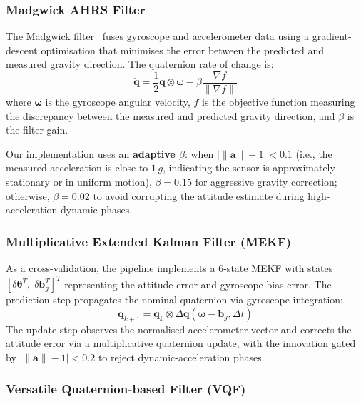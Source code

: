\subsubsection{Madgwick AHRS Filter}

The Madgwick filter~\cite{madgwick2011} fuses gyroscope and accelerometer data using a gradient-descent optimisation that minimises the error between the predicted and measured gravity direction.
The quaternion rate of change is:
\begin{equation}\label{eq:madgwick}
  \dot{\mathbf{q}} = \frac{1}{2}\mathbf{q} \otimes \boldsymbol{\omega} - \beta \frac{\nabla f}{\|\nabla f\|}
\end{equation}
where $\boldsymbol{\omega}$ is the gyroscope angular velocity, $f$ is the objective function measuring the discrepancy between the measured and predicted gravity direction, and $\beta$ is the filter gain.

Our implementation uses an \textbf{adaptive $\beta$}: when $\left|\|\mathbf{a}\| - 1\right| < 0.1$ (i.e., the measured acceleration is close to $1\,g$, indicating the sensor is approximately stationary or in uniform motion), $\beta = 0.15$ for aggressive gravity correction; otherwise, $\beta = 0.02$ to avoid corrupting the attitude estimate during high-acceleration dynamic phases.

\subsubsection{Multiplicative Extended Kalman Filter (MEKF)}

As a cross-validation, the pipeline implements a 6-state MEKF with states $[\delta\boldsymbol{\theta}^T,\; \delta\mathbf{b}_g^T]^T$ representing the attitude error and gyroscope bias error.
The prediction step propagates the nominal quaternion via gyroscope integration:
\begin{equation}
  \mathbf{q}_{k+1} = \mathbf{q}_k \otimes \Delta\mathbf{q}(\boldsymbol{\omega} - \mathbf{b}_g, \Delta t)
\end{equation}
The update step observes the normalised accelerometer vector and corrects the attitude error via a multiplicative quaternion update, with the innovation gated by $\left|\|\mathbf{a}\| - 1\right| < 0.2$ to reject dynamic-acceleration phases.

\subsubsection{Versatile Quaternion-based Filter (VQF)}


